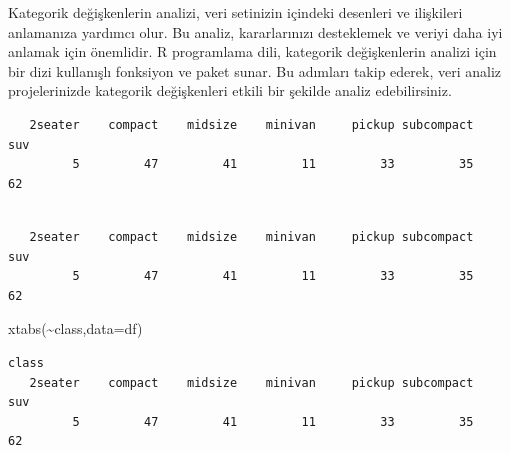 \documentclass[
  letterpaper,
  DIV=11,
  numbers=noendperiod]{scrreprt}
\newenvironment{Shaded}{\begin{snugshade}}{\end{snugshade}}
\newcommand{\AttributeTok}[1]{\textcolor[rgb]{0.40,0.45,0.13}{#1}}
\newcommand{\CommentTok}[1]{\textcolor[rgb]{0.37,0.37,0.37}{#1}}
\newcommand{\FunctionTok}[1]{\textcolor[rgb]{0.28,0.35,0.67}{#1}}
\newcommand{\NormalTok}[1]{\textcolor[rgb]{0.00,0.23,0.31}{#1}}
\newcommand{\SpecialCharTok}[1]{\textcolor[rgb]{0.37,0.37,0.37}{#1}}
\begin{document}
Kategorik değişkenlerin analizi, veri setinizin içindeki desenleri ve
ilişkileri anlamanıza yardımcı olur. Bu analiz, kararlarınızı
desteklemek ve veriyi daha iyi anlamak için önemlidir. R programlama
dili, kategorik değişkenlerin analizi için bir dizi kullanışlı fonksiyon
ve paket sunar. Bu adımları takip ederek, veri analiz projelerinizde
kategorik değişkenleri etkili bir şekilde analiz edebilirsiniz.

\begin{Shaded}
\end{Shaded}

\begin{verbatim}
   2seater    compact    midsize    minivan     pickup subcompact        suv 
         5         47         41         11         33         35         62 
\end{verbatim}

\begin{Shaded}
\end{Shaded}

\begin{verbatim}

   2seater    compact    midsize    minivan     pickup subcompact        suv 
         5         47         41         11         33         35         62 
\end{verbatim}

\begin{Shaded}
\begin{Highlighting}[]
\FunctionTok{xtabs}\NormalTok{(}\SpecialCharTok{\textasciitilde{}}\NormalTok{class,}\AttributeTok{data=}\NormalTok{df)}
\end{Highlighting}
\end{Shaded}

\begin{verbatim}
class
   2seater    compact    midsize    minivan     pickup subcompact        suv 
         5         47         41         11         33         35         62 
\end{verbatim}
\end{document}
